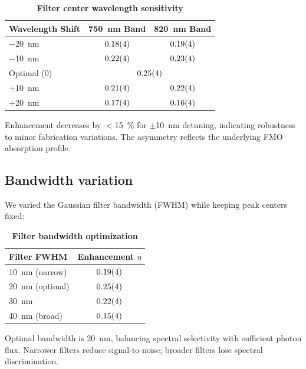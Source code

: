 \documentclass[11pt,a4paper]{article}
\begin{document}
\begin{table}[htb]
\centering
\caption{\textbf{Filter center wavelength sensitivity}}
\label{tab:SI_wavelength}
\begin{tabular}{lcc}
\toprule
\textbf{Wavelength Shift} & \textbf{750~nm Band} & \textbf{820~nm Band} \\
\midrule
$-$\SI{20}{\nano\meter} & $\num{0.18 \pm 0.04}$ & $\num{0.19 \pm 0.04}$ \\
$-$\SI{10}{\nano\meter} & $\num{0.22 \pm 0.04}$ & $\num{0.23 \pm 0.04}$ \\
Optimal (0) & \multicolumn{2}{c}{$\num{0.25 \pm 0.04}$} \\
$+$\SI{10}{\nano\meter} & $\num{0.21 \pm 0.04}$ & $\num{0.22 \pm 0.04}$ \\
$+$\SI{20}{\nano\meter} & $\num{0.17 \pm 0.04}$ & $\num{0.16 \pm 0.04}$ \\
\bottomrule
\end{tabular}
\end{table}

Enhancement decreases by $<$\SI{15}{\percent} for $\pm$\SI{10}{\nano\meter} detuning, indicating robustness to minor fabrication variations. The asymmetry reflects the underlying FMO absorption profile.

\subsection{Bandwidth variation}

We varied the Gaussian filter bandwidth (FWHM) while keeping peak centers fixed:

\begin{table}[htb]
\centering
\caption{\textbf{Filter bandwidth optimization}}
\label{tab:SI_bandwidth}
\begin{tabular}{lc}
\toprule
\textbf{Filter FWHM} & \textbf{Enhancement $\eta$} \\
\midrule
\SI{10}{\nano\meter} (narrow) & $\num{0.19 \pm 0.04}$ \\
\SI{20}{\nano\meter} (optimal) & $\num{0.25 \pm 0.04}$ \\
\SI{30}{\nano\meter} & $\num{0.22 \pm 0.04}$ \\
\SI{40}{\nano\meter} (broad) & $\num{0.15 \pm 0.04}$ \\
\bottomrule
\end{tabular}
\end{table}

Optimal bandwidth is \SI{20}{\nano\meter}, balancing spectral selectivity with sufficient photon flux. Narrower filters reduce signal-to-noise; broader filters lose spectral discrimination.
\end{document}
